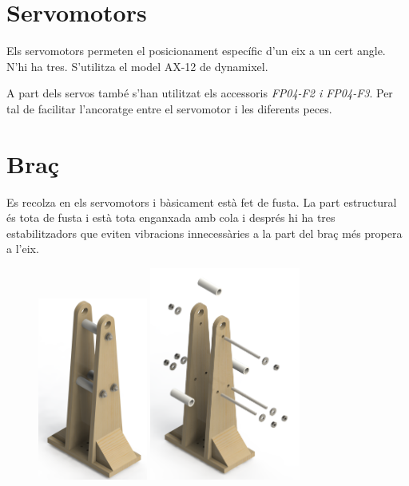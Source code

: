 \documentclass[a4paper, 10pt]{article}
\begin{document}
\newpage
\section{Servomotors}
\begin{flushleft}
Els servomotors permeten el posicionament específic d'un eix a un cert angle. N'hi ha tres. S'utilitza el model AX-12 de dynamixel. 

A part dels servos també s'han utilitzat els accessoris \emph{FP04-F2 i FP04-F3}. Per tal de facilitar l'ancoratge entre el servomotor i les diferents peces.
\end{flushleft}



\newpage
\section{Braç}
\begin{flushleft}
Es recolza en els servomotors i bàsicament està fet de fusta. La part estructural és tota de fusta i està tota enganxada amb cola i després hi ha tres estabilitzadors que eviten vibracions innecessàries a la part del braç més propera a l'eix. 

\end{flushleft}

\begin{figure}[h!]
\hfill
\includegraphics[height=6cm]{./images/brac}
\hfill
\includegraphics[height=7cm]{./images/brac_expl}
\hfill
\end{figure}
\end{document}
